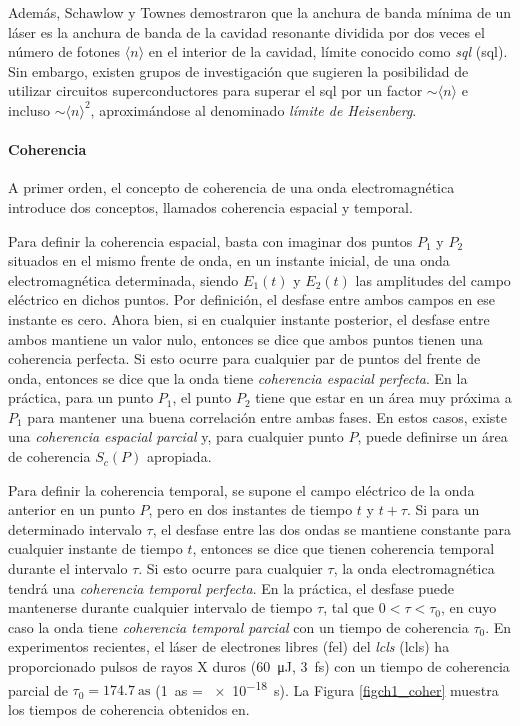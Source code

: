 Además, Schawlow y Townes demostraron que la anchura de banda mínima de un láser es la anchura de banda de la cavidad resonante dividida por dos veces el número de fotones $\langle n\rangle$ en el interior de la cavidad, límite conocido como \emph{\acrlong{sql}} (\acrshort{sql}). Sin embargo, existen grupos de investigación\autocite{Liu2021ProposalLimit} que sugieren la posibilidad de utilizar circuitos superconductores para superar el \acrshort{sql} por un factor $\sim\langle n\rangle$ e incluso $\sim\langle n\rangle^2$, aproximándose al denominado \emph{límite de Heisenberg}.

\paragraph{Coherencia} \label{par1122}
A primer orden, el concepto de coherencia de una onda electromagnética introduce dos conceptos, llamados coherencia espacial y temporal\autocite{Svelto2010PrinciplesLasers}.

Para definir la coherencia espacial, basta con imaginar dos puntos $P_1$ y $P_2$ situados en el mismo frente de onda, en un instante inicial, de una onda electromagnética determinada, siendo $E_1(t)$ y $E_2(t)$ las amplitudes del campo eléctrico en dichos puntos. Por definición, el desfase entre ambos campos en ese instante es cero. Ahora bien, si en cualquier instante posterior, el desfase entre ambos mantiene un valor nulo, entonces se dice que ambos puntos tienen una coherencia perfecta. Si esto ocurre para cualquier par de puntos del frente de onda, entonces se dice que la onda tiene \emph{coherencia espacial perfecta}. En la práctica, para un punto $P_1$, el punto $P_2$ tiene que estar en un área muy próxima a $P_1$ para mantener una buena correlación entre ambas fases. En estos casos, existe una \emph{coherencia espacial parcial} y, para cualquier punto $P$, puede definirse un área de coherencia $S_c(P)$ apropiada.

Para definir la coherencia temporal, se supone el campo eléctrico de la onda anterior en un punto $P$, pero en dos instantes de tiempo $t$ y $t+\tau$. Si para un determinado intervalo $\tau$, el desfase entre las dos ondas se mantiene constante para cualquier instante de tiempo $t$, entonces se dice que tienen coherencia temporal durante el intervalo $\tau$. Si esto ocurre para cualquier $\tau$, la onda electromagnética tendrá una \emph{coherencia temporal perfecta}. En la práctica, el desfase puede mantenerse durante cualquier intervalo de tiempo $\tau$, tal que $0<\tau<\tau_0$, en cuyo caso la onda tiene \emph{coherencia temporal parcial} con un tiempo de coherencia $\tau_0$. En experimentos recientes\autocite{Zhou2020AttosecondLaser}, el láser de electrones libres (\acrshort{fel}) del \emph{\acrlong{lcls}} (\acrshort{lcls}) ha proporcionado pulsos de rayos X duros (\qty{60}{\uJ}, \qty{3}{\fs}) con un tiempo de coherencia parcial de $\tau_0 = \qty{174,7}{\as}$ (\qty{1}{\as} = \qty{e-18}{\s}). La Figura \ref{figch1_coher} muestra los tiempos de coherencia obtenidos en\autocite{Zhou2020AttosecondLaser}. 

